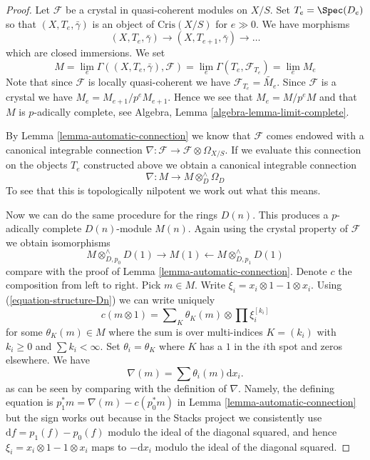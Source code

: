 \begin{proof}
Let $\mathcal{F}$ be a crystal in quasi-coherent modules on $X/S$.
Set $T_e = \Spec(D_e)$ so that $(X, T_e, \bar\gamma)$ is an object
of $\text{Cris}(X/S)$ for $e \gg 0$. We have morphisms
$$
(X, T_e, \bar\gamma) \to (X, T_{e + 1}, \bar\gamma) \to \ldots
$$
which are closed immersions. We set
$$
M =
\lim_e \Gamma((X, T_e, \bar\gamma), \mathcal{F}) =
\lim_e \Gamma(T_e, \mathcal{F}_{T_e}) = \lim_e M_e
$$
Note that since $\mathcal{F}$ is locally quasi-coherent we have
$\mathcal{F}_{T_e} = \widetilde{M_e}$. Since $\mathcal{F}$ is a
crystal we have $M_e = M_{e + 1}/p^eM_{e + 1}$. Hence we see that
$M_e = M/p^eM$ and that $M$ is $p$-adically complete, see
Algebra, Lemma \ref{algebra-lemma-limit-complete}.

\medskip\noindent
By Lemma \ref{lemma-automatic-connection} we know that $\mathcal{F}$
comes endowed with a canonical integrable connection
$\nabla : \mathcal{F} \to \mathcal{F} \otimes \Omega_{X/S}$.
If we evaluate this connection on the objects $T_e$ constructed above
we obtain a canonical integrable connection
$$
\nabla : M \longrightarrow M \otimes^\wedge_D \Omega_D
$$
To see that this is topologically nilpotent we work out what this means.

\medskip\noindent
Now we can do the same procedure for the rings $D(n)$.
This produces a $p$-adically complete $D(n)$-module $M(n)$. Again using
the crystal property of $\mathcal{F}$ we obtain isomorphisms
$$
M \otimes^\wedge_{D, p_0} D(1) \rightarrow M(1)
\leftarrow M \otimes^\wedge_{D, p_1} D(1)
$$
compare with the proof of Lemma \ref{lemma-automatic-connection}.
Denote $c$ the composition from left to right. Pick $m \in M$.
Write $\xi_i = x_i \otimes 1 - 1 \otimes x_i$.
Using (\ref{equation-structure-Dn}) we can write uniquely
$$
c(m \otimes 1) = \sum\nolimits_K \theta_K(m) \otimes \prod \xi_i^{[k_i]}
$$
for some $\theta_K(m) \in M$ where the sum is over multi-indices
$K = (k_i)$ with $k_i \geq 0$ and $\sum k_i < \infty$. Set
$\theta_i = \theta_K$ where $K$ has a $1$ in the $i$th spot and
zeros elsewhere. We have
$$
\nabla(m) = \sum \theta_i(m) \text{d}x_i.
$$
as can be seen by comparing with the definition of
$\nabla$. Namely, the defining equation is
$p_1^*m = \nabla(m) - c(p_0^*m)$ in Lemma \ref{lemma-automatic-connection}
but the sign works out because in the Stacks project we consistently use
$\text{d}f = p_1(f) - p_0(f)$ modulo the ideal of the diagonal squared,
and hence $\xi_i = x_i \otimes 1 - 1 \otimes x_i$ maps to $-\text{d}x_i$
modulo the ideal of the diagonal squared.


\end{proof}
